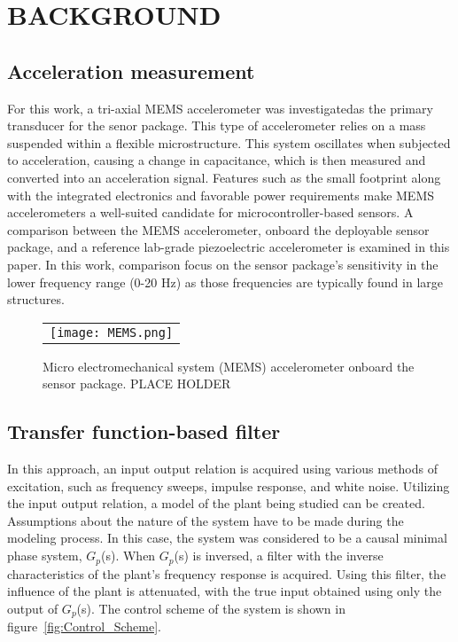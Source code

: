 \documentclass[]{spie}  %
\newcommand{\bl}[1]{\textcolor[rgb]{0.00,0.00,1.00}{#1}}
\begin{document}
	\section{BACKGROUND}
		\subsection{Acceleration measurement}
	\label{sec:title}
	
	For this work, a tri-axial MEMS accelerometer was investigatedas the primary transducer for the senor package. This type of accelerometer relies on a mass suspended within a flexible microstructure. This system oscillates when subjected to acceleration, causing a change in capacitance, which is then measured and converted into an acceleration signal\cite{AYDEMIR2016}. Features such as the small footprint along with the integrated electronics and favorable power requirements make MEMS accelerometers a well-suited candidate for microcontroller-based sensors. A comparison between the MEMS accelerometer, onboard the deployable sensor package, and a reference lab-grade piezoelectric accelerometer is examined in this paper. In this work, comparison focus on the sensor package's sensitivity in the lower frequency range (0-20 Hz) as those frequencies are typically found in large structures\cite{KARPEL1997}.	

	\begin{figure} [H]
	\begin{center}
		\begin{tabular}{c} 
			\texttt{[image: MEMS.png]}
		\end{tabular}
	\end{center}
	\caption[example] 
	{ \label{fig:MEMS} 
		Micro electromechanical system (MEMS) accelerometer onboard the sensor package. \bl{PLACE HOLDER}}
\end{figure} 	
	
		\subsection{Transfer function-based filter}
	In this approach, an input output relation is acquired using various methods of excitation, such as frequency sweeps, impulse response, and white noise. Utilizing the input output relation, a model of the plant being studied can be created. Assumptions about the nature of the system have to be made during the modeling process. In this case, the system was considered to be a causal minimal phase system, $G_p$(s). When $G_p$(s) is inversed, a filter with the inverse characteristics of the plant’s frequency response is acquired. Using this filter, the influence of the plant is attenuated, with the true input obtained using only the output of $G_p$(s). The control scheme of the system is shown in figure~\ref{fig:Control_Scheme}.
	
\end{document}
